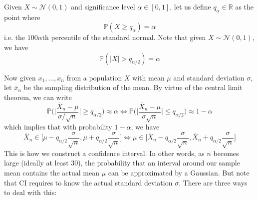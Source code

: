\documentclass{article}
\begin{document}
    \begin{definition}[Percentile]
      Given $X \sim \mathcal{N}(0, 1)$ and significance level $\alpha \in [0, 1]$, let us define $q_{\alpha} \in \mathbb{R}$ as the point where 
      \begin{equation}
        \mathbb{P}(X \geq q_{\alpha}) = \alpha
      \end{equation}
      i.e. the $100\alpha$th percentile of the standard normal. Note that given $X \sim \mathcal{N}(0, 1)$, we have 
      \begin{equation}
        \mathbb{P} (|X| > q_{\alpha/2}) = \alpha
      \end{equation}
    \end{definition}

    Now given $x_1, \ldots, x_n$ from a population $X$ with mean $\mu$ and standard deviation $\sigma$, let $\overline{x}_n$ be the sampling distribution of the mean. By virtue of the central limit theorem, we can write
    \begin{equation}
      \mathbb{P} \bigg( \bigg| \frac{\overline{X}_n - \mu}{\sigma / \sqrt{n}} \bigg| \geq q_{\alpha/2} \bigg) \approx \alpha \iff \mathbb{P} \bigg( \bigg| \frac{\overline{X}_n - \mu}{\sigma \sqrt{n}} \bigg| \leq q_{\alpha/2} \bigg) \approx 1 - \alpha
    \end{equation}
    which implies that with probability $1 - \alpha$, we have 
    \begin{equation}
      \overline{X}_n \in \bigg[ \mu - q_{\alpha/2} \frac{\sigma}{\sqrt{n}}, \mu + q_{\alpha/2} 
      \frac{\sigma}{\sqrt{n}} \bigg] \iff \mu \in \bigg[ \overline{X}_n - q_{\alpha/2} \frac{\sigma}{\sqrt{n}}, \overline{X}_n + q_{\alpha/2} \frac{\sigma}{\sqrt{n}} \bigg]
    \end{equation}
    This is how we construct a confidence interval. In other words, as $n$ becomes large (ideally at least $30$), the probability that an interval around our sample mean contains the actual mean $\mu$ can be approximated by a Gaussian. But note that CI requires to know the actual standard deviation $\sigma$. There are three ways to deal with this: 
\end{document}

